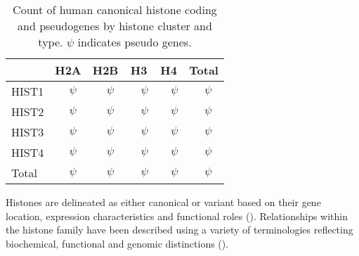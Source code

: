\begin{table*}[hp]
	\caption{
	Count of human canonical histone coding and pseudogenes by histone cluster and type.
	$\psi$ indicates pseudo genes.}
	\label{tab:histone-gene-count}
	\centering
	\begin{tabular}{l r@{ + }l<{$\psi$} r@{ + }l<{$\psi$} r@{ + }l<{$\psi$} r@{ + }l<{$\psi$} r@{ + }l<{$\psi$}}
		\toprule
		\null   & \multicolumn{2}{c}{H2A}  & \multicolumn{2}{c}{H2B}
			& \multicolumn{2}{c}{H3}   & \multicolumn{2}{c}{H4}
			& \multicolumn{2}{c}{Total} \\
		\midrule
		HIST1   & \HTwoACodingInHISTOne{}     & \HTwoAPseudoInHISTOne{}
			& \HTwoBCodingInHISTOne{}     & \HTwoBPseudoInHISTOne{}
			& \HThreeCodingInHISTOne{}    & \HThreePseudoInHISTOne{}
			& \HFourCodingInHISTOne{}     & \HFourPseudoInHISTOne{}
			& \CodingGenesInHISTOne{}     & \PseudoGenesInHISTOne{} \\
		HIST2   & \HTwoACodingInHISTTwo{}     & \HTwoAPseudoInHISTTwo{}
			& \HTwoBCodingInHISTTwo{}     & \HTwoBPseudoInHISTTwo{}
			& \HThreeCodingInHISTTwo{}    & \HThreePseudoInHISTTwo{}
			& \HFourCodingInHISTTwo{}     & \HFourPseudoInHISTTwo{}
			& \CodingGenesInHISTTwo{}     & \PseudoGenesInHISTTwo{} \\
		HIST3   & \HTwoACodingInHISTThree{}   & \HTwoAPseudoInHISTThree{}
			& \HTwoBCodingInHISTThree{}   & \HTwoBPseudoInHISTThree{}
			& \HThreeCodingInHISTThree{}  & \HThreePseudoInHISTThree{}
			& \HFourCodingInHISTThree{}   & \HFourPseudoInHISTThree{}
			& \CodingGenesInHISTThree{}   & \PseudoGenesInHISTThree{} \\
		HIST4   & \HTwoACodingInHISTFour{}    & \HTwoAPseudoInHISTFour{}
			& \HTwoBCodingInHISTFour{}    & \HTwoBPseudoInHISTFour{}
			& \HThreeCodingInHISTFour{}   & \HThreePseudoInHISTFour{}
			& \HFourCodingInHISTFour{}    & \HFourPseudoInHISTFour{}
			& \CodingGenesInHISTFour{}  & \PseudoGenesInHISTFour{} \\
		\addlinespace
		Total   & \HTwoACodingGenes{}       & \HTwoAPseudoGenes{}
			& \HTwoBCodingGenes{}       & \HTwoBPseudoGenes{}
			& \HThreeCodingGenes{}      & \HThreePseudoGenes{}
			& \HFourCodingGenes{}       & \HFourPseudoGenes{}
			& \TotalCodingGenes{}       & \TotalPseudoGenes{} \\
		\bottomrule
	\end{tabular}
\end{table*}

	Histones are delineated as either canonical or variant based on 
	their gene location, expression characteristics and functional roles ().
	Relationships within the histone family have been described using a variety of terminologies
	reflecting biochemical, functional and genomic distinctions ().

